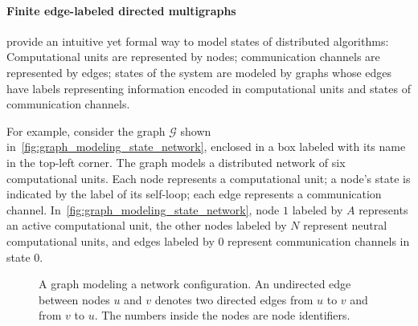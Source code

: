 \paragraph{Finite edge-labeled directed multigraphs} provide an intuitive yet formal way to model states of distributed algorithms: Computational units are represented by nodes; communication channels are represented by edges; states of the system are modeled by graphs whose edges have labels representing information encoded in computational units and states of communication channels. 

For example, consider the graph $\mathcal{G}$ shown in~\autoref{fig:graph_modeling_state_network}, enclosed in a box labeled with its name in the top-left corner. 
The graph models a distributed network of six computational units.
Each node represents a computational unit; a node's state is indicated by the label of its self-loop; each edge represents a communication channel. In~\autoref{fig:graph_modeling_state_network}, node $1$ labeled by $A$ represents an active computational unit, the other nodes labeled by $N$ represent neutral computational units, and edges labeled by $0$ represent communication channels in state $0$.
\begin{figure}[H]
        \centering
    \caption{A graph modeling a network configuration. An undirected edge between nodes $u$ and $v$ denotes two directed edges from $u$ to $v$ and from $v$ to $u$. The numbers inside the nodes are node identifiers.}
    \label{fig:graph_modeling_state_network}
\end{figure}


